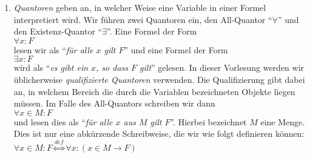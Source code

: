 \begin{enumerate}
\item \emph{Quantoren}
      geben an, in welcher Weise eine Variable in einer Formel interpretiert wird. 
      Wir f\"{u}hren zwei Quantoren ein, 
      den All-Quantor ``$\forall$'' und den Existenz-Quantor ``$\exists$''.  Eine Formel der Form\\[0.2cm]
      \hspace*{1.3cm} $\forall x: F$ \\[0.2cm]
      lesen wir als ``\emph{f\"{u}r alle $x$ gilt $F$}'' und eine Formel der Form \\[0.2cm]
      \hspace*{1.3cm} $\exists x: F$ \\[0.2cm]
      wird als ``\emph{es gibt ein $x$, so dass $F$ gilt}'' gelesen.  In dieser Vorlesung
      werden wir \"{u}blicherweise \emph{qualifizierte Quantoren} verwenden.  Die Qualifizierung
      gibt dabei an, in welchem Bereich die durch die Variablen bezeichneten Objekte liegen m\"{u}ssen.
      Im Falle des All-Quantors schreiben wir dann \\[0.2cm]
      \hspace*{1.3cm} $\forall x \in M: F$ \\[0.2cm]
      und lesen dies als ``\emph{f\"{u}r alle $x$ aus $M$ gilt $F$}''.  Hierbei bezeichnet $M$
      eine Menge. Dies ist nur eine abk\"{u}rzende Schreibweise,
      die wir wie folgt definieren k\"{o}nnen: \\[0.2cm]
      \hspace*{1.3cm} $\forall x \in M: F \stackrel{de\!f}{\Longleftrightarrow} \forall x\colon (x\in M \rightarrow F)$ 


\end{enumerate}
